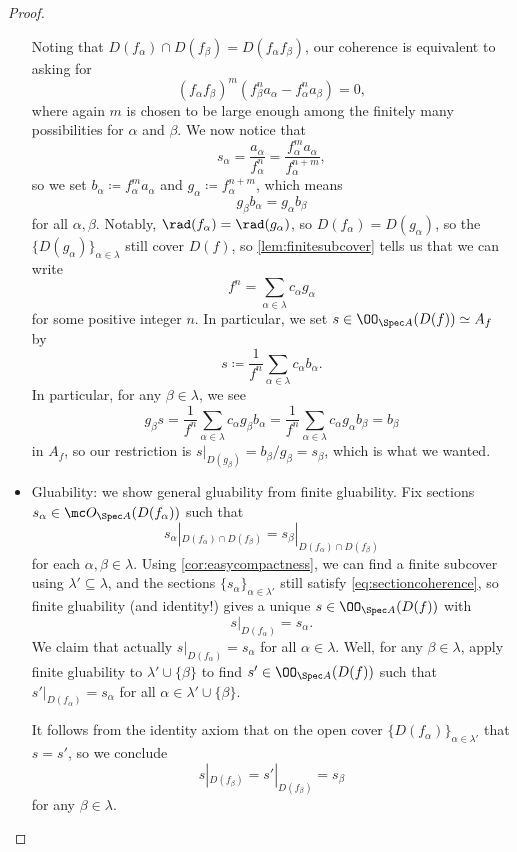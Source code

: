 \documentclass[../notes.tex]{subfiles}
\begin{document}
\begin{proof}
\begin{itemize}
		Noting that $D(f_\alpha)\cap D(f_\beta)=D(f_\alpha f_\beta)$, our coherence is equivalent to asking for
		\[(f_\alpha f_\beta)^m\left(f_\beta^na_\alpha-f_\alpha^na_\beta\right)=0,\]
		where again $m$ is chosen to be large enough among the finitely many possibilities for $\alpha$ and $\beta$. We now notice that
		\[s_\alpha=\frac{a_\alpha}{f_\alpha^n}=\frac{f_\alpha^ma_\alpha}{f_\alpha^{n+m}},\]
		so we set $b_\alpha\coloneqq f_\alpha^ma_\alpha$ and $g_\alpha\coloneqq f_\alpha^{n+m}$, which means
		\[g_\beta b_\alpha=g_\alpha b_\beta\]
		for all $\alpha,\beta$. Notably, $\rad(f_\alpha)=\rad(g_\alpha)$, so $D(f_\alpha)=D(g_\alpha)$, so the $\{D(g_\alpha)\}_{\alpha\in\lambda}$ still cover $D(f)$, so \autoref{lem:finitesubcover} tells us that we can write
		\[f^n=\sum_{\alpha\in\lambda}c_\alpha g_\alpha\]
		for some positive integer $n$. In particular, we set $s\in\OO_{\Spec A}(D(f))\simeq A_f$ by
		\[s\coloneqq\frac1{f^n}\sum_{\alpha\in\lambda}c_\alpha b_\alpha.\]
		In particular, for any $\beta\in\lambda$, we see
		\[g_\beta s=\frac1{f^n}\sum_{\alpha\in\lambda}c_\alpha g_\beta b_\alpha=\frac1{f^n}\sum_{\alpha\in\lambda}c_\alpha g_\alpha b_\beta=b_\beta\]
		in $A_f$, so our restriction is $s|_{D(g_\beta)}=b_\beta/g_\beta=s_\beta$, which is what we wanted.

		\item Gluability: we show general gluability from finite gluability. Fix sections $s_\alpha\in\mc O_{\Spec A}(D(f_\alpha))$ such that
		\begin{equation}
			s_\alpha|_{D(f_\alpha)\cap D(f_\beta)}=s_\beta|_{D(f_\alpha)\cap D(f_\beta)} \label{eq:sectioncoherence}
		\end{equation}
		for each $\alpha,\beta\in\lambda$. Using \autoref{cor:easycompactness}, we can find a finite subcover using $\lambda'\subseteq\lambda$, and the sections $\{s_\alpha\}_{\alpha\in\lambda'}$ still satisfy \autoref{eq:sectioncoherence}, so finite gluability (and identity!) gives a unique $s\in\OO_{\Spec A}(D(f))$ with
		\[s|_{D(f_\alpha)}=s_\alpha.\]
		We claim that actually $s|_{D(f_\alpha)}=s_\alpha$ for all $\alpha\in\lambda$. Well, for any $\beta\in\lambda$, apply finite gluability to $\lambda'\cup\{\beta\}$ to find $s'\in\OO_{\Spec A}(D(f))$ such that $s'|_{D(f_\alpha)}=s_\alpha$ for all $\alpha\in\lambda'\cup\{\beta\}$.
		
		It follows from the identity axiom that on the open cover $\{D(f_\alpha)\}_{\alpha\in\lambda'}$ that $s=s'$, so we conclude
		\[s|_{D(f_\beta)}=s'|_{D(f_\beta)}=s_\beta\]
		for any $\beta\in\lambda$.
		\qedhere
	\end{itemize}
\end{proof}
\end{document}
